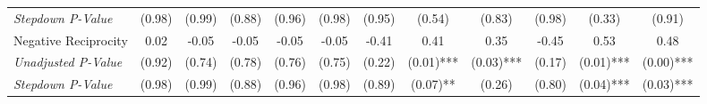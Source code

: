 \begin{tabular}{l c c c c c c c c c c c}
\quad \textit{Stepdown P-Value} & (0.98) & (0.99) & (0.88) & (0.96) & (0.98) & (0.95) & (0.54) & (0.83) & (0.98) & (0.33) & (0.91) \\
Negative Reciprocity & 0.02 & -0.05 & -0.05 & -0.05 & -0.05 & -0.41 & 0.41 & 0.35 & -0.45 & 0.53 & 0.48 \\
\quad \textit{Unadjusted P-Value} & (0.92) & (0.74) & (0.78) & (0.76) & (0.75) & (0.22) & (0.01)*** & (0.03)*** & (0.17) & (0.01)*** & (0.00)*** \\
\quad \textit{Stepdown P-Value} & (0.98) & (0.99) & (0.88) & (0.96) & (0.98) & (0.89) & (0.07)** & (0.26) & (0.80) & (0.04)*** & (0.03)*** \\
\bottomrule
\end{tabular}
